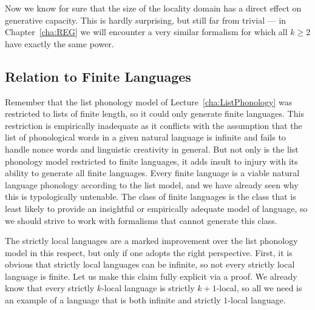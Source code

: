 Now we know for sure that the size of the locality domain has a direct effect on generative capacity.
This is hardly surprising, but still far from trivial --- in Chapter~\ref{cha:REG} we will encounter a very similar formalism for which all $k \geq 2$ have exactly the same power.


\subsection{Relation to Finite Languages}

Remember that the list phonology model of Lecture~\ref{cha:ListPhonology} was restricted to lists of finite length, so it could only generate finite languages.
This restriction is empirically inadequate as it conflicts with the assumption that the list of phonological words in a given natural language is infinite and fails to handle nonce words and linguistic creativity in general.
But not only is the list phonology model restricted to finite languages, it adds insult to injury with its ability to generate all finite languages.
Every finite language is a viable natural language phonology according to the list model, and we have already seen why this is typologically untenable.
The class of finite languages is the class that is least likely to provide an insightful or empirically adequate model of language, so we should strive to work with formalisms that cannot generate this class.

The strictly local languages are a marked improvement over the list phonology model in this respect, but only if one adopts the right perspective.
First, it is obvious that strictly local languages can be infinite, so not every strictly local language is finite.
Let us make this claim fully explicit via a proof.
We already know that every strictly $k$-local language is strictly $k+1$-local, so all we need is an example of a language that is both infinite and strictly $1$-local language.

